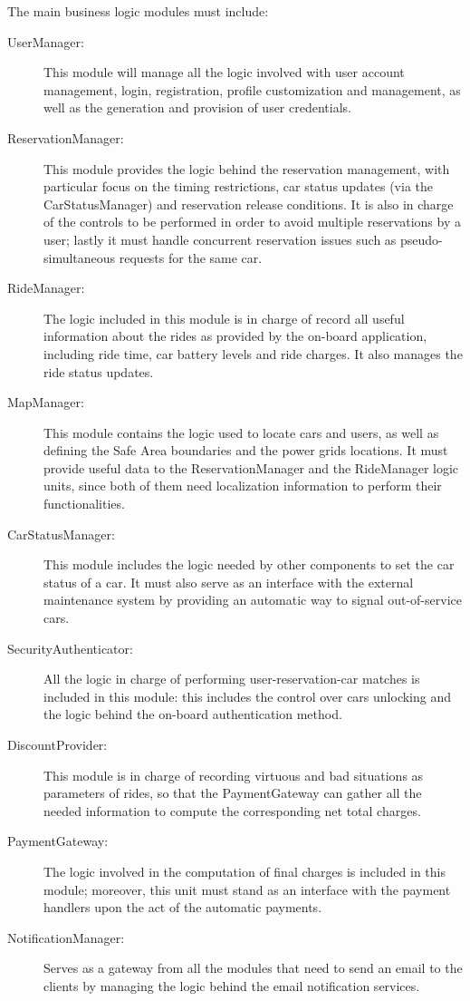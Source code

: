 The main business logic modules must include:

\begin{description}
\item[UserManager:] This module will manage all the logic involved with user account management, login, registration, profile customization and management, as well as the generation and provision of user credentials.
\item[ReservationManager:] This module provides the logic behind the reservation management, with particular focus on the timing restrictions, car status updates (via the CarStatusManager) and reservation release conditions. It is also in charge of the controls to be performed in order to avoid multiple reservations by a user; lastly it must handle concurrent reservation issues such as pseudo-simultaneous requests for the same car.
\item[RideManager:] The logic included in this module is in charge of record all useful information about the rides as provided by the on-board application, including ride time, car battery levels and ride charges. It also manages the ride status updates.
\item[MapManager:] This module contains the logic used to locate cars and users, as well as defining the Safe Area boundaries and the power grids locations. It must provide useful data to the ReservationManager and the RideManager logic units, since both of them need localization information to perform their functionalities.
\item[CarStatusManager:] This module includes the logic needed by other components to set the car status of a car. It must also serve as an interface with the external maintenance system by providing an automatic way to signal out-of-service cars.
\item[SecurityAuthenticator:] All the logic in charge of performing user-reservation-car matches is included in this module: this includes the control over cars unlocking and the logic behind the on-board authentication method.
\item[DiscountProvider:] This module is in charge of recording virtuous and bad situations as parameters of rides, so that the PaymentGateway can gather all the needed information to compute the corresponding net total charges.
\item[PaymentGateway:] The logic involved in the computation of final charges is included in this module; moreover, this unit must stand as an interface with the payment handlers upon the act of the automatic payments.
\item[NotificationManager:] Serves as a gateway from all the modules that need to send an email to the clients by managing the logic behind the email notification services.
\end{description}

